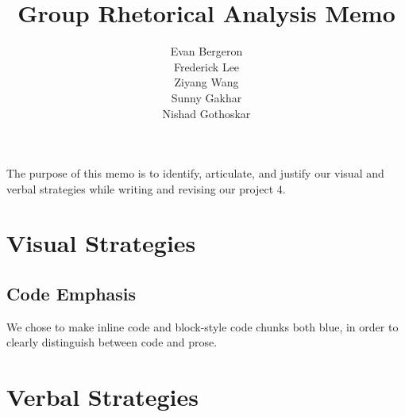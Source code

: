 \documentclass{article}
\title{Group Rhetorical Analysis Memo}
\author{Evan Bergeron\\
Frederick Lee\\
Ziyang Wang\\
Sunny Gakhar\\
Nishad Gothoskar}
\begin{document}
\maketitle

The purpose of this memo is to identify, articulate, and justify our
visual and verbal strategies while writing and revising our project 4.

\section{Visual Strategies}

\subsection{Code Emphasis}

We chose to make inline code and block-style code chunks both
blue, in order to clearly distinguish between code and prose.

\section{Verbal Strategies}
\end{document}
